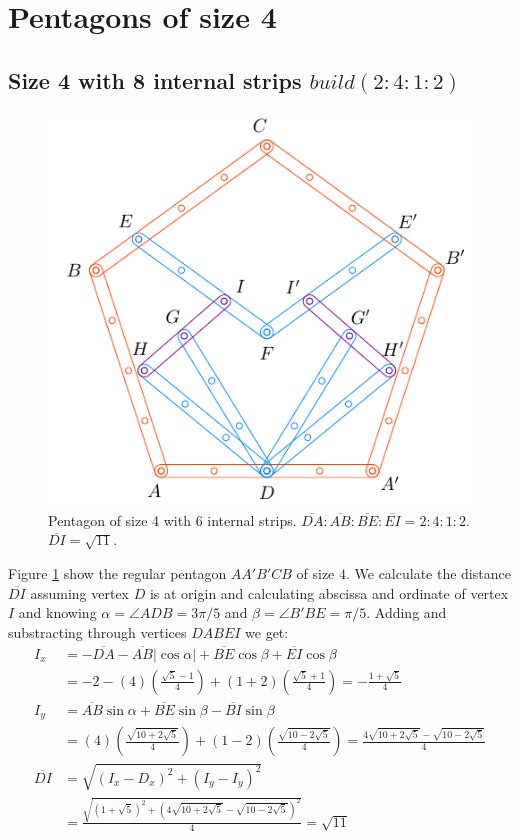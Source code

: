 \documentclass[11pt]{article}
\begin{document}

\section{Pentagons of size 4}

\subsection{Size 4 with 8 internal strips $build(2:4:1:2)$}

\begin{figure}[H]
\centering
\includegraphics[scale=1.1]{4/penta4-8a}
\caption{Pentagon of size 4 with 6 internal strips. $\overline{DA} : \overline{AB} : \overline{BE} : \overline{EI} = 2:4:1:2$. $\overline{DI} = \sqrt{11}$.}
\label{fig:penta4-8a}
\end{figure}

Figure \ref{fig:penta4-8a} show the regular pentagon $AA'B'CB$ of size $4$. We calculate the distance $\overline{DI}$ assuming vertex $D$ is at origin and calculating abscissa and ordinate of vertex $I$ and knowing $\alpha = \angle{ADB} = 3\pi / 5$ and $\beta = \angle{B'BE} = \pi / 5$. Adding and substracting through vertices $DABEI$ we get:
\begin{align}
I_x &= -\overline{DA} - \overline{AB}|\cos\alpha| + \overline{BE}\cos\beta + \overline{EI}\cos\beta \nonumber\\
 &= -2 -(4)\left(\frac{\sqrt5 - 1}4\right) + (1+2)\left(\frac{\sqrt5+1}4\right)
 = -\frac{1+\sqrt5}4 \\
I_y &= \overline{AB}\sin\alpha + \overline{BE}\sin\beta - \overline{BI}\sin\beta \nonumber\\
 &= (4)\left(\frac{\sqrt{10+2\sqrt5}}4\right) + (1-2)\left(\frac{\sqrt{10-2\sqrt5}}4\right)
 = \frac{4\sqrt{10+2\sqrt5} - \sqrt{10-2\sqrt5}}4 \\
%
\overline{DI} &= \sqrt{(I_x - D_x)^2 + (I_y - I_y)^2} \nonumber\\
 &= \frac{\sqrt{(1+\sqrt5)^2 + (4\sqrt{10+2\sqrt5} - \sqrt{10-2\sqrt5})^2}}4
 = \sqrt{11}
\end{align}
\end{document}
